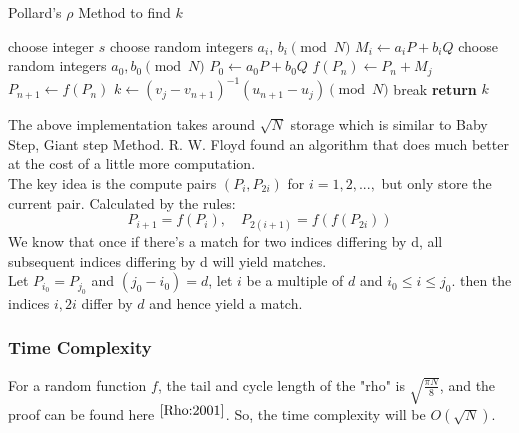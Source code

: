\begin{algorithm}
\caption{Pollard's $\rho$ Method to find $k$}\label{P_rho}
\begin{algorithmic}[1]
\State choose integer $s$ 
\State choose random integers $a_i$, $b_i \pmod N$
\State $M_i \gets a_iP + b_iQ$
\EndFor
\State choose random integers $a_0 , b_0 \pmod N$
\State $P_0 \gets a_0P + b_0Q$
\State $f(P_n) \gets P_n + M_{j}$
\State $P_{n+1} \gets f(P_n)$
 
\State $k \gets (v_j - v_{n+1})^{-1}( u_{n+1} - u_{j})\pmod{N}$
\State break 
\EndIf
\EndFor
\State \textbf{return} $k$
\EndProcedure
\end{algorithmic}
\end{algorithm}

The above implementation takes around $\sqrt{N}$ storage which is similar to Baby Step, Giant step Method. R. W. Floyd found an algorithm that does much better at the cost of a little more computation.\\
The key idea is the compute pairs $(P_i, P_{2i})$ for $i = 1,2,...,$ but only store the current pair. Calculated by the rules:
\[P_{i+1} = f(P_i), \quad P_{2(i+1)} = f(f(P_{2i}))\]
We know that once if there's a match for two indices differing by d, all subsequent indices differing by d will yield matches.\\
Let $P_{i_0} = P_{j_0}$ and $(j_0 - i_0) = d$, let $i$ be a multiple of $d$ and $i_0 \leq i \leq j_0$. then the indices $i, 2i$ differ by $d$ and hence yield a match.
\subsubsection{Time Complexity} 
For a random function $f$, the tail and cycle length of the "rho" is $\sqrt{\frac{\pi N}{8}}$, and the proof can be found here $^{\cite{Rho:2001}}$.
So, the time complexity will be $O(\sqrt{N})$. 

